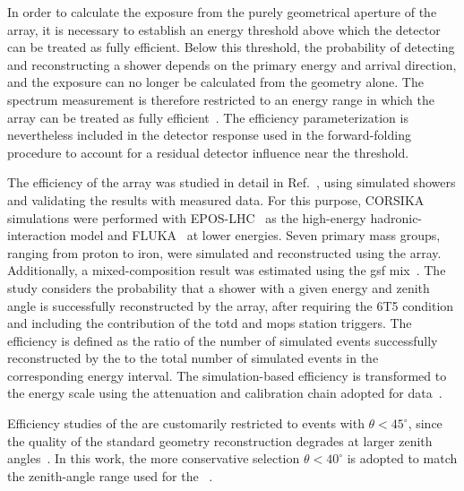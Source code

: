 \documentclass[main.tex]{subfiles}
\begin{document}
In order to calculate the exposure from the purely geometrical aperture of the array, it is necessary to establish an energy threshold above which the detector can be treated as fully efficient.
Below this threshold, the probability of detecting and reconstructing a shower depends on the primary energy and arrival direction, and the exposure can no longer be calculated from the geometry alone.
The spectrum measurement is therefore restricted to an energy range in which the array can be treated as fully efficient~\cite{PierreAuger:2010:TriggerAperture}.
The efficiency parameterization is nevertheless included in the detector response used in the forward-folding procedure to account for a residual detector influence near the threshold.

The efficiency of the  array was studied in detail in Ref.~\cite{GAP:Rodriguez:2024:Efficiency}, using simulated showers and validating the results with measured data.
For this purpose, CORSIKA simulations were performed with EPOS-LHC~\cite{Pierog:2015:EPOSLHC} as the high-energy hadronic-interaction model and FLUKA~\cite{Battistoni:2008:FLUKA} at lower energies.
Seven primary mass groups, ranging from proton to iron, were simulated and reconstructed using the  array.
Additionally, a mixed-composition result was estimated using the \gls{gsf} mix~\cite{Dembinski:2017:GSF}.
The study considers the probability that a shower with a given energy and zenith angle is successfully reconstructed by the array, after requiring the 6T5 condition and including the contribution of the \gls{totd} and \gls{mops} station triggers.
The efficiency is defined as the ratio of the number of simulated events successfully reconstructed by the  to the total number of simulated events in the corresponding energy interval.
The simulation-based efficiency is transformed to the  energy scale using the attenuation and calibration chain adopted for data~\cite{GAP:Rodriguez:2024:Efficiency}.

Efficiency studies of the  are customarily restricted to events with $\theta<45^\circ$, since the quality of the standard geometry reconstruction degrades at larger zenith angles~\cite{GAP:Rodriguez:2024:Efficiency}.
In this work, the more conservative selection $\theta<40^\circ$ is adopted to match the zenith-angle range used for the ~\cite{PierreAuger:2021:InfillSpectrum}.
\end{document}
